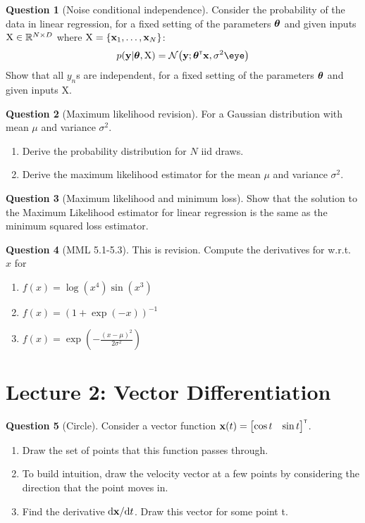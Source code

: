 \documentclass[a4paper]{article}
\newcommand{\mat}[1]{{\mathrm{{#1}}}} %
\theoremstyle{definition}
\newtheorem{question}{Question}
\begin{document}
\begin{question}[Noise conditional independence]
Consider the probability of the data in linear regression, for a fixed setting of the parameters $\boldsymbol{\theta}$ and given inputs $\mat X \in \Reals^{N\times D}$ where $\mat X = \{\vx_1, \dots, \vx_N\}$:
\begin{align}
p(\vy|\vtheta,\mat X) = \NormDist{\vy; \vtheta\transpose\vx, \sigma^2 \eye}
\end{align}
Show that all $y_n$s are independent, for a fixed setting of the parameters $\boldsymbol{\theta}$ and given inputs $\mat X$.
\end{question}

\begin{question}[Maximum likelihood revision]
\label{q:MLE-Niid}
For a Gaussian distribution with mean $\mu$ and variance $\sigma^2$.
\begin{enumerate}[label=\alph*.]
\item Derive the probability distribution for $N$ iid draws.
\item Derive the maximum likelihood estimator for the mean $\mu$ and variance $\sigma^2$.
\end{enumerate}
\end{question}

\begin{question}[Maximum likelihood and minimum loss]
\label{q:MLEReg}
Show that the solution to the Maximum Likelihood estimator for linear regression is the same as the minimum squared loss estimator.
\end{question}

\begin{question}[MML 5.1-5.3]
\label{q:chainrule}
This is revision. Compute the derivatives for w.r.t.~$x$ for
\begin{enumerate}[label=\alph*.]
\item $f(x) = \log (x^4) \sin (x^3)$
\item $f(x) = (1 + \exp(-x))^{-1}$
\item $f(x) = \exp\left(-\frac{(x-\mu)^2}{2\sigma^2}\right)$
\end{enumerate}
\end{question}

\section{Lecture 2: Vector Differentiation}
\begin{question}[Circle]
\label{q:circle}
Consider a vector function $\mathbf{x}(t) = \begin{bmatrix}\cos t & \sin t\end{bmatrix}^\mathrm{\textsf{\tiny T}}$.
\begin{enumerate}[label=\alph*.]
\item Draw the set of points that this function passes through.
\item To build intuition, draw the velocity vector at a few points by considering the direction that the point moves in.
\item Find the derivative $\mathrm{d}\mathbf{x} / \mathrm{d} t$. Draw this vector for some point t.
\end{enumerate}
\end{question}
\end{document}
